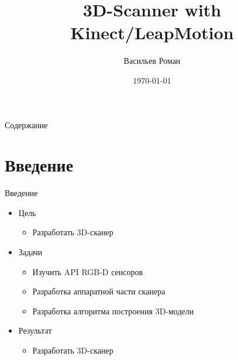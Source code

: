 \documentclass{beamer}
\title[Практика]{3D-Scanner with Kinect/LeapMotion}
\author{Васильев Роман}
\institute[СПбАУ]
{
Санкт-Петербургский \\
Национальный Исследовательский  \\
Академический Университет \\
Российской Академии Наук \\

\medskip{
Научный руководитель \\
}
}
\date{\today}
\begin{document}
\begin{frame}
    \titlepage
\end{frame}


\begin{frame}{Содержание}
    \tableofcontents 
\end{frame}



\section{Введение}

\begin{frame}{Введение}
    \begin{itemize}
        \item Цель
        \begin{itemize}
            \item Разработать 3D-сканер
        \end{itemize}
        \item Задачи
        \begin{itemize}
            \item Изучить API RGB-D сенсоров
            \item Разработка аппаратной части сканера
            \item Разработка алгоритма построения 3D-модели
        \end{itemize}
        \item Результат
        \begin{itemize}
            \item Разработать 3D-сканер
        \end{itemize}
    \end{itemize}
    
\end{frame}



    
\end{document}
